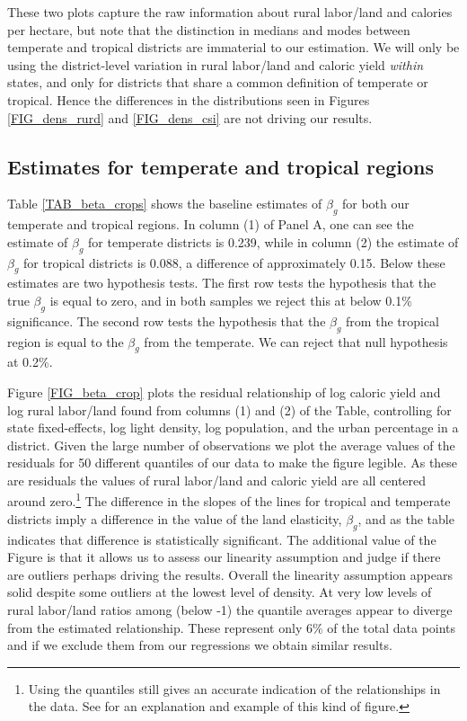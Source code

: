 \documentclass[11pt]{article}
\begin{document}
These two plots capture the raw information about rural labor/land and calories per hectare, but note that the distinction in medians and modes between temperate and tropical districts are immaterial to our estimation. We will only be using the district-level variation in rural labor/land and caloric yield \textit{within} states, and only for districts that share a common definition of temperate or tropical. Hence the differences in the distributions seen in Figures \ref{FIG_dens_rurd} and \ref{FIG_dens_csi} are not driving our results. 

\subsection{Estimates for temperate and tropical regions}
Table \ref{TAB_beta_crops} shows the baseline estimates of $\beta_g$ for both our temperate and tropical regions. In column (1) of Panel A, one can see the estimate of $\beta_g$ for temperate districts is 0.239, while in column (2) the estimate of $\beta_g$ for tropical districts is 0.088, a difference of approximately 0.15. Below these estimates are two hypothesis tests. The first row tests the hypothesis that the true $\beta_g$ is equal to zero, and in both samples we reject this at below 0.1\% significance. The second row tests the hypothesis that the $\beta_g$ from the tropical region is equal to the $\beta_g$ from the temperate. We can reject that null hypothesis at 0.2\%.

Figure \ref{FIG_beta_crop} plots the residual relationship of log caloric yield and log rural labor/land found from columns (1) and (2) of the Table, controlling for state fixed-effects, log light density, log population, and the urban percentage in a district. Given the large number of observations we plot the average values of the residuals for 50 different quantiles of our data to make the figure legible. As these are residuals the values of rural labor/land and caloric yield are all centered around zero.\footnote{Using the quantiles still gives an accurate indication of the relationships in the data. See \citet{cfs2013} for an explanation and example of this kind of figure.} The difference in the slopes of the lines for tropical and temperate districts imply a difference in the value of the land elasticity, $\beta_g$, and as the table indicates that difference is statistically significant. The additional value of the Figure is that it allows us to assess our linearity assumption and judge if there are outliers perhaps driving the results. Overall the linearity assumption appears solid despite some outliers at the lowest level of density. At very low levels of rural labor/land ratios among (below -1) the quantile averages appear to diverge from the estimated relationship. These represent only 6\% of the total data points and if we exclude them from our regressions we obtain similar results.
\end{document}
